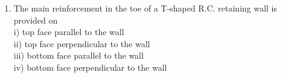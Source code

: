 \documentclass[11pt,a4paper]{article}
\begin{document}
\begin{enumerate}
{i) bottom face near counterfort \\
ii) top face near counterfort \\
iii) bottom face near centre of span \\
iv) top face near centre of span  \\
The correct answer is}
\begin{enumerate}[label=\Alph*.]
\item{Only (i)}
\item{Only (ii)}
\item{Both (i) and (iv)}
\item{Both (ii) and (iii)}
\end{enumerate}
\item{The main reinforcement in the toe of a T-shaped R.C. retaining wall is provided on \\

i) top face parallel to the wall \\

ii) top face perpendicular to the wall \\

iii) bottom face parallel to the wall \\

iv) bottom face perpendicular to the wall \\

}
\end{enumerate}
\end{document}
